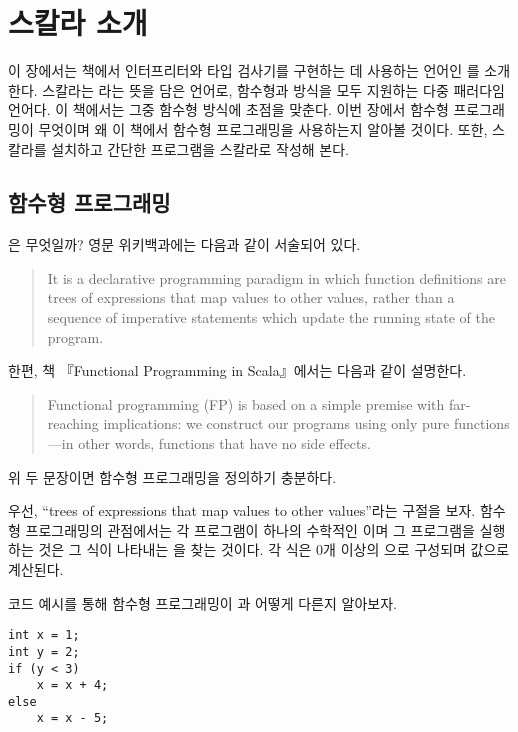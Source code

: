 \chapter{스칼라 소개}

이 장에서는 책에서 인터프리터와 타입 검사기를 구현하는 데 사용하는 언어인
를 소개한다. 스칼라는 라는 뜻을
담은 언어로, 함수형과  방식을 모두 지원하는 다중
패러다임 언어다. 이 책에서는 그중 함수형 방식에 초점을 맞춘다. 이번 장에서
함수형 프로그래밍이 무엇이며 왜 이 책에서 함수형 프로그래밍을 사용하는지 알아볼
것이다. 또한, 스칼라를 설치하고 간단한 프로그램을 스칼라로 작성해 본다.

\section{함수형 프로그래밍}

은 무엇일까? 영문 위키백과에는 다음과
같이 서술되어 있다.

\begin{quote}
It is a declarative programming paradigm in which function definitions are trees
of expressions that map values to other values, rather than a sequence of
imperative statements which update the running state of the program.
\end{quote}

한편, 책 『Functional Programming in Scala』에서는 다음과 같이 설명한다.

\begin{quote}
Functional programming (FP) is based on a simple premise with far-reaching
implications: we construct our programs using only pure functions---in other words,
functions that have no side effects.
\end{quote}

위 두 문장이면 함수형 프로그래밍을 정의하기 충분하다.

우선, ``trees of expressions that map values to other values''라는 구절을 보자.
함수형 프로그래밍의 관점에서는 각 프로그램이 하나의 수학적인
이며
그 프로그램을 실행하는 것은 그 식이 나타내는 을 찾는 것이다. 각 식은
0개 이상의 으로 구성되며 값으로 계산된다.

코드 예시를 통해 함수형 프로그래밍이 과
어떻게 다른지 알아보자.

\begin{verbatim}
int x = 1;
int y = 2;
if (y < 3)
    x = x + 4;
else
    x = x - 5;
\end{verbatim}

